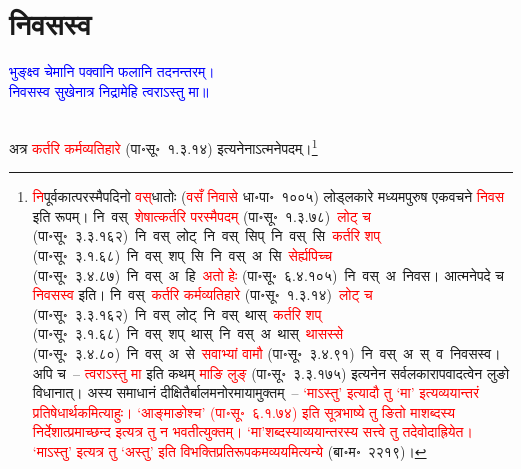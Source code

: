 \section[निवसस्व]{निवसस्व}
\centering\textcolor{blue}{भुङ्क्ष्व चेमानि पक्वानि फलानि तदनन्तरम्।\nopagebreak\\
निवसस्व सुखेनात्र निद्रामेहि त्वराऽस्तु मा॥}\nopagebreak\\
\\
\fontsize{14}{21}\selectfont\begin{sloppypar}\justifying\noindent\hspace{10mm} अत्र \textcolor{red}{कर्तरि कर्म\-व्यतिहारे} (पा॰सू॰~१.३.१४) इत्यनेनाऽत्मनेपदम्।\footnote{\textcolor{red}{नि}पूर्वकात्परस्मै\-पदिनो \textcolor{red}{वस्‌}\-धातोः (\textcolor{red}{वसँ निवासे} धा॰पा॰~१००५) लोड्लकारे मध्यम\-पुरुष एकवचने \textcolor{red}{निवस} इति रूपम्। नि~वस्~\arrow \textcolor{red}{शेषात्कर्तरि परस्मैपदम्} (पा॰सू॰~१.३.७८)~\arrow \textcolor{red}{लोट् च} (पा॰सू॰~३.३.१६२)~\arrow नि~वस्~लोट्~\arrow नि~वस्~सिप्~\arrow नि~वस्~सि~\arrow \textcolor{red}{कर्तरि शप्} (पा॰सू॰~३.१.६८)~\arrow नि~वस्~शप्~सि~\arrow नि~वस्~अ~सि~\arrow \textcolor{red}{सेर्ह्यपिच्च} (पा॰सू॰~३.४.८७)~\arrow नि~वस्~अ~हि~\arrow \textcolor{red}{अतो हेः} (पा॰सू॰~६.४.१०५)~\arrow नि~वस्~अ~\arrow निवस। आत्मनेपदे च \textcolor{red}{निवसस्व} इति। नि~वस्~\arrow \textcolor{red}{कर्तरि कर्मव्यतिहारे} (पा॰सू॰~१.३.१४)~\arrow \textcolor{red}{लोट् च} (पा॰सू॰~३.३.१६२)~\arrow नि~वस्~लोट्~\arrow नि~वस्~थास्~\arrow \textcolor{red}{कर्तरि शप्} (पा॰सू॰~३.१.६८)~\arrow नि~वस्~शप्~थास्~\arrow नि~वस्~अ~थास्~\arrow \textcolor{red}{थासस्से} (पा॰सू॰~३.४.८०)~\arrow नि~वस्~अ~से~\arrow \textcolor{red}{सवाभ्यां वामौ} (पा॰सू॰~३.४.९१)~\arrow नि~वस्~अ~स्~व~\arrow निवसस्व। अपि च~– \textcolor{red}{त्वराऽस्तु मा} इति कथम् \textcolor{red}{माङि लुङ्} (पा॰सू॰~३.३.१७५) इत्यनेन सर्व\-लकारापवादत्वेन लुङो विधानात्। अस्य समाधानं दीक्षितैर्बाल\-मनोरमायामुक्तम्~– \textcolor{red}{‘माऽस्तु’ इत्यादौ तु ‘मा’ इत्यव्ययान्तरं प्रतिषेधार्थकमित्याहुः। ‘आङ्माङोश्च’ (पा॰सू॰~६.१.७४) इति सूत्रभाष्ये तु ङितो माशब्दस्य निर्देशात्प्रमाच्छन्द इत्यत्र तु न भवतीत्युक्तम्। ‘मा’\-शब्दस्याव्ययान्तरस्य सत्त्वे तु तदेवोदाह्रियेत। ‘माऽस्तु’ इत्यत्र तु ‘अस्तु’ इति विभक्ति\-प्रतिरूपकमव्ययमित्यन्ये} (बा॰म॰~२२१९)।}\end{sloppypar}
